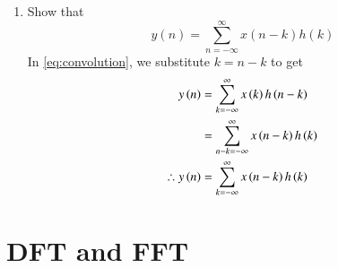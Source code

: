 \documentclass[journal,12pt,twocolumn]{IEEEtran}
\theoremstyle{remark}
\begin{document}
\begin{enumerate}[label=\thesection.\arabic*]
\item Show that
\begin{equation}
y(n) =  \sum_{n=-\infty}^{\infty}x(n-k)h(k)
\end{equation}
\solution
In \eqref{eq:convolution}, we substitute $k = n - k$ to get
\begin{align}
    y\left(n\right) &= \sum_{k=-\infty}^{\infty}x\left(k\right)h\left(n - k\right) \\
              &= \sum_{n - k=-\infty}^{\infty}x\left(n - k\right)h\left(k\right) \\
    \therefore y\left(n\right) &= \sum_{k=-\infty}^{\infty}x\left(n - k\right)h\left(k\right)
\end{align}
\end{enumerate}

\section{DFT and FFT}
\end{document}
